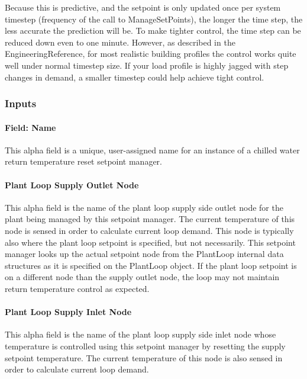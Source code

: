 Because this is predictive, and the setpoint is only updated once per system timestep (frequency of the call to ManageSetPoints), the longer the time step, the less accurate the prediction will be. To make tighter control, the time step can be reduced down even to one minute. However, as described in the EngineeringReference, for most realistic building profiles the control works quite well under normal timestep size. If your load profile is highly jagged with step changes in demand, a smaller timestep could help achieve tight control.

\subsubsection{Inputs}\label{inputs-26-001}

\paragraph{Field: Name}\label{field-name-27-001}

This alpha field is a unique, user-assigned name for an instance of a chilled water return temperature reset setpoint manager.

\paragraph{Plant Loop Supply Outlet Node}\label{plant-loop-supply-outlet-node}

This alpha field is the name of the plant loop supply side outlet node for the plant being managed by this setpoint manager. The current temperature of this node is sensed in order to calculate current loop demand. This node is typically also where the plant loop setpoint is specified, but not necessarily. This setpoint manager looks up the actual setpoint node from the PlantLoop internal data structures as it is specified on the PlantLoop object. If the plant loop setpoint is on a different node than the supply outlet node, the loop may not maintain return temperature control as expected.

\paragraph{Plant Loop Supply Inlet Node}\label{plant-loop-supply-inlet-node}

This alpha field is the name of the plant loop supply side inlet node whose temperature is controlled using this setpoint manager by resetting the supply setpoint temperature. The current temperature of this node is also sensed in order to calculate current loop demand.

